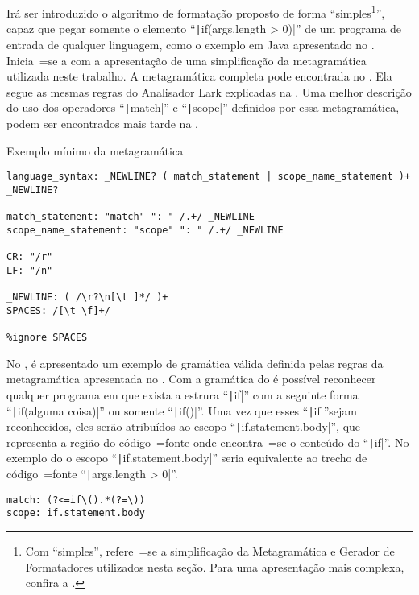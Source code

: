Irá ser introduzido o algoritmo de formatação proposto de forma ``simples\footnote{
Com ``simples'',
refere~=se a simplificação da Metagramática e
Gerador de Formatadores utilizados nesta seção.
Para uma apresentação mais complexa,
confira a .
}'',
capaz que pegar somente o elemento ``\texttt|if(args.length > 0)|'' de um programa de entrada de qualquer linguagem,
como o exemplo em Java apresentado no .
Inicia~=se a com a apresentação de uma simplificação da metagramática utilizada neste trabalho.
A metagramática completa pode encontrada no .
Ela segue as mesmas regras do Analisador Lark explicadas na .
Uma melhor descrição do uso dos operadores ``\texttt|match|'' e
``\texttt|scope|'' definidos por essa metagramática,
podem ser encontrados mais tarde na .
\begin{code}
\caption{Exemplo mínimo da metagramática}
\label{code:exemploMinimoDeMetagramatica}
\begin{verbatim}
language_syntax: _NEWLINE? ( match_statement | scope_name_statement )+ _NEWLINE?

match_statement: "match" ": " /.+/ _NEWLINE
scope_name_statement: "scope" ": " /.+/ _NEWLINE

CR: "/r"
LF: "/n"

_NEWLINE: ( /\r?\n[\t ]*/ )+
SPACES: /[\t \f]+/

%ignore SPACES
\end{verbatim}
\end{code}

No ,
é apresentado um exemplo de gramática válida definida pelas regras da metagramática apresentada no .
Com a gramática do  é possível reconhecer qualquer programa em que exista a estrura ``\texttt|if|'' com a seguinte forma ``\texttt|if(alguma coisa)|'' ou
somente ``\texttt|if()|''.
Uma vez que esses ``\texttt|if|''\s sejam reconhecidos,
eles serão atribuídos ao escopo ``\texttt|if.statement.body|'',
que representa a região do código~=fonte onde encontra~=se o conteúdo do ``\texttt|if|''.
No exemplo do  o escopo ``\texttt|if.statement.body|'' seria equivalente ao trecho de código~=fonte ``\texttt|args.length > 0|''.
\begin{lstlisting}[caption={Exemplo de gramática pelas regras da mínima metagramática},label={code:exemploDeGramaticaPelasRegrasDaMetagramatica},style=yaml_style]
match: (?<=if\().*(?=\))
scope: if.statement.body
\end{lstlisting}

